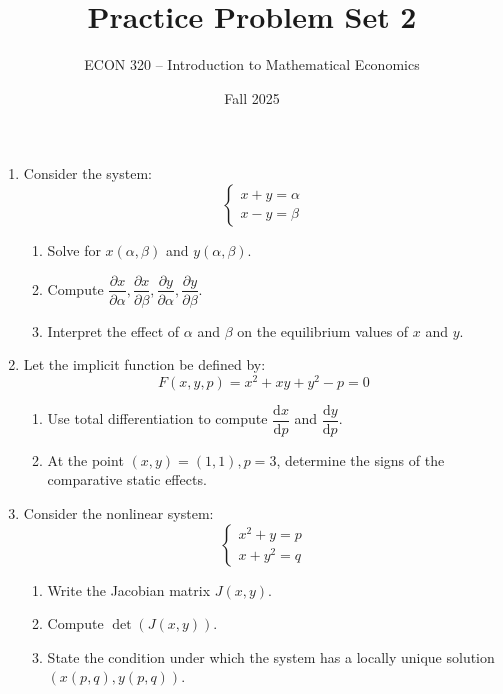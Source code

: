 \documentclass[12pt]{article}
\title{Practice Problem Set 2}
\author{ECON 320 -- Introduction to Mathematical Economics}
\date{Fall 2025}
\begin{document}
\maketitle

\begin{enumerate}


\item Consider the system:
\[
\begin{cases}
x + y = \alpha \\
x - y = \beta
\end{cases}
\]
\begin{enumerate}[label=(\alph*)]
\item Solve for $x(\alpha,\beta)$ and $y(\alpha,\beta)$.
\item Compute $\dfrac{\partial x}{\partial \alpha}, \dfrac{\partial x}{\partial \beta}, \dfrac{\partial y}{\partial \alpha}, \dfrac{\partial y}{\partial \beta}$.
\item Interpret the effect of $\alpha$ and $\beta$ on the equilibrium values of $x$ and $y$.
\end{enumerate}


\item Let the implicit function be defined by:
\[
F(x,y,p) = x^2 + xy + y^2 - p = 0
\]
\begin{enumerate}[label=(\alph*)]
\item Use total differentiation to compute $\dfrac{\mathrm{d}x}{\mathrm{d}p}$ and $\dfrac{\mathrm{d}y}{\mathrm{d}p}$.
\item At the point $(x,y)=(1,1), p=3$, determine the signs of the comparative static effects.
\end{enumerate}


\item Consider the nonlinear system:
\[
\begin{cases}
x^2 + y = p \\
x + y^2 = q
\end{cases}
\]
\begin{enumerate}[label=(\alph*)]
\item Write the Jacobian matrix $J(x,y)$.
\item Compute $\det(J(x,y))$.
\item State the condition under which the system has a locally unique solution $(x(p,q),y(p,q))$.
\end{enumerate}



\end{enumerate}
\end{document}
